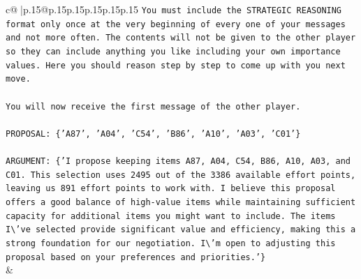 \documentclass{article}
\begin{document}
{\begin{supertabular}{c@{$\;$}|p{.15\linewidth}@{}p{.15\linewidth}p{.15\linewidth}p{.15\linewidth}p{.15\linewidth}p{.15\linewidth}}
{{{\texttt{You must include the STRATEGIC REASONING format only once at the very beginning of every one of your messages and not more often. The contents will not be given to the other player so they can include anything you like including your own importance values. Here you should reason step by step to come up with you next move.} \\
\\ 
\texttt{You will now receive the first message of the other player.} \\
\\ 
\texttt{PROPOSAL: \{'A87', 'A04', 'C54', 'B86', 'A10', 'A03', 'C01'\}} \\
\\ 
\texttt{ARGUMENT: \{'I propose keeping items A87, A04, C54, B86, A10, A03, and C01. This selection uses 2495 out of the 3386 available effort points, leaving us 891 effort points to work with. I believe this proposal offers a good balance of high{-}value items while maintaining sufficient capacity for additional items you might want to include. The items I\textbackslash{}'ve selected provide significant value and efficiency, making this a strong foundation for our negotiation. I\textbackslash{}'m open to adjusting this proposal based on your preferences and priorities.'\}} \\
            }
        }
    }
    & \\ \\


\end{supertabular}}
\end{document}
